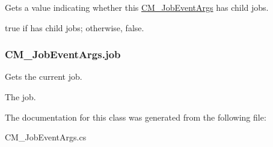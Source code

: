 Gets a value indicating whether this \hyperlink{class_c_m___job_event_args}{C\+M\+\_\+\+Job\+Event\+Args} has child jobs. 

{\ttfamily true} if has child jobs; otherwise, {\ttfamily false}.\hypertarget{class_c_m___job_event_args_a602ecf7364ca2e6a2285f1622e7f1c8b}{}
\subsubsection[{job}]{ C\+M\+\_\+\+Job\+Event\+Args.\+job\hspace{0.3cm}{\ttfamily [get]}}\label{class_c_m___job_event_args_a602ecf7364ca2e6a2285f1622e7f1c8b}


Gets the current job. 

The job.

The documentation for this class was generated from the following file\+:\begin{DoxyCompactItemize}
\item 
C\+M\+\_\+\+Job\+Event\+Args.\+cs\end{DoxyCompactItemize}
